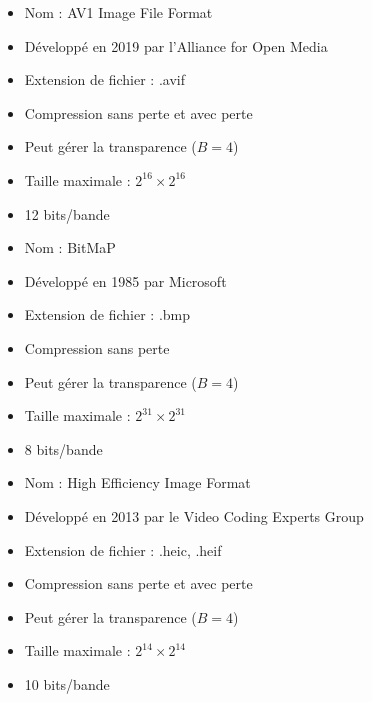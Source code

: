 \begin{description}[leftmargin=!, labelwidth=\widthof{\bfseries JPEG 2000}]
    \item[AVIF] 
        \begin{itemize}
            \item Nom : AV1 Image File Format
            \item Développé en 2019 par l'Alliance for Open Media
            \item Extension de fichier : .avif
            \item Compression sans perte et avec perte
            \item Peut gérer la transparence (\( B = 4 \))
            \item Taille maximale : \( 2^{16} \times 2^{16} \)
            \item 12 bits/bande
        \end{itemize}
        
    \item[BMP] 
        \begin{itemize}
            \item Nom : BitMaP
            \item Développé en 1985 par Microsoft
            \item Extension de fichier : .bmp
            \item Compression sans perte
            \item Peut gérer la transparence (\( B = 4 \))
            \item Taille maximale : \( 2^{31} \times 2^{31} \)
            \item 8 bits/bande
        \end{itemize}
        
    \item[HEIC] 
        \begin{itemize}
            \item Nom : High Efficiency Image Format
            \item Développé en 2013 par le Video Coding Experts Group
            \item Extension de fichier : .heic, .heif
            \item Compression sans perte et avec perte
            \item Peut gérer la transparence (\( B = 4 \))
            \item Taille maximale : \( 2^{14} \times 2^{14} \)
            \item 10 bits/bande
        \end{itemize}
        

\end{description}
